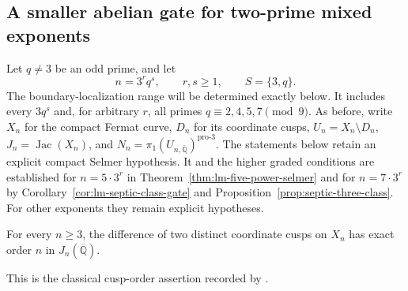 \subsection{A smaller abelian gate for two-prime mixed exponents}
\label{subsec:lm-mixed-compact-gate}

Let $q\ne3$ be an odd prime, and let
\[
 n=3^r q^s,\qquad r,s\ge1,\qquad S=\{3,q\}.
\]
The boundary-localization range will be determined exactly below. It
includes every $3q^s$ and, for arbitrary $r$, all primes
$q\equiv2,4,5,7\pmod9$.
As before, write $X_n$ for the compact Fermat curve,
$D_n$ for its coordinate cusps, $U_n=X_n\setminus D_n$,
$J_n=\operatorname{Jac}(X_n)$, and
$N_n=\pi_1(U_{n,\overline{\mathbb Q}})^{\mathrm{pro}\text{-}3}$.
The statements below retain an explicit compact Selmer hypothesis.
It and the higher graded conditions are established for $n=5\cdot3^r$
in Theorem~\ref{thm:lm-five-power-selmer} and for $n=7\cdot3^r$
by Corollary~\ref{cor:lm-septic-class-gate} and
Proposition~\ref{prop:septic-three-class}. For other exponents
they remain explicit hypotheses.

\begin{lemma}
\label{lem:lm-exact-cusp-order}
For every $n\ge3$, the difference of two distinct coordinate
cusps on $X_n$ has exact order $n$ in $J_n(\overline{\mathbb Q})$.
\end{lemma}
This is the classical cusp-order assertion recorded by
\citet[p.~191, immediately before Theorem~A]{Coleman1986}.

